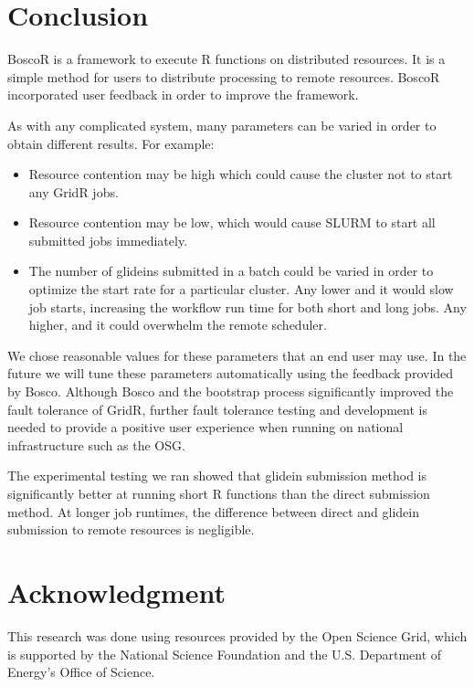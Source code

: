\documentclass[conference]{IEEEtran}
\begin{document}
\section{Conclusion}

BoscoR is a framework to execute R functions on distributed resources.  It is a simple method for users to distribute processing to remote resources.  BoscoR incorporated user feedback in order to improve the framework.

As with any complicated system, many parameters can be varied in order to obtain different results.  For example:
\begin{itemize}
\item Resource contention may be high which could cause the cluster not to start any GridR jobs.
\item Resource contention may be low, which would cause SLURM to start all submitted jobs immediately.
\item The number of glideins submitted in a batch could be varied in order to optimize the start rate for a particular cluster.  Any lower and it would slow job starts, increasing the workflow run time for both short and long jobs.  Any higher, and it could overwhelm the remote scheduler.
\end{itemize}

We chose reasonable values for these parameters that an end user may use.  In the future we will tune these parameters automatically using the feedback provided by Bosco.  Although Bosco and the bootstrap process significantly improved the fault tolerance of GridR, further fault tolerance testing and development is needed to provide a positive user experience when running on national infrastructure such as the OSG.

The experimental testing we ran showed that glidein submission method is significantly better at running short R functions than the direct submission method.  At longer job runtimes, the difference between direct and glidein submission to remote resources is negligible.








\section*{Acknowledgment}
This research was done using resources provided by the Open Science Grid, which is supported by the National Science Foundation and the U.S. Department of Energy's Office of Science.
\end{document}
